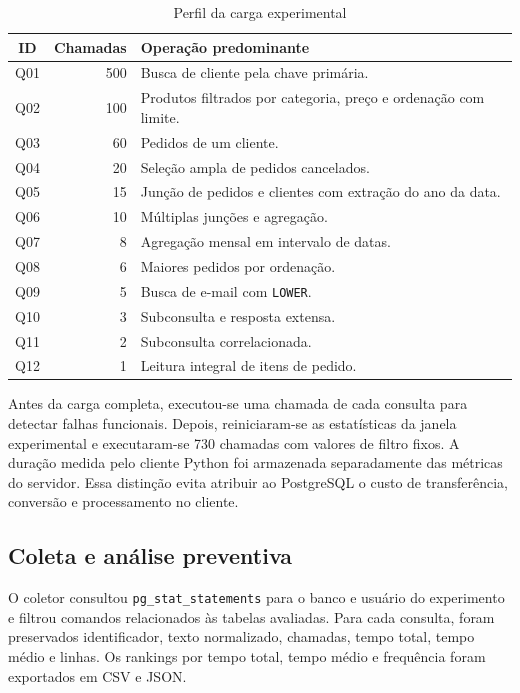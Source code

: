 \documentclass{UNESC}
\newcommand{\codigo}[1]{\texttt{#1}}
\begin{document}
\begin{table}[H]
\centering
\caption{Perfil da carga experimental}
\label{tab:carga}
\small
\begin{tabularx}{\textwidth}{c r Y}
\toprule
\textbf{ID} & \textbf{Chamadas} & \textbf{Operação predominante}\\
\midrule
Q01 & 500 & Busca de cliente pela chave primária.\\
Q02 & 100 & Produtos filtrados por categoria, preço e ordenação com limite.\\
Q03 & 60 & Pedidos de um cliente.\\
Q04 & 20 & Seleção ampla de pedidos cancelados.\\
Q05 & 15 & Junção de pedidos e clientes com extração do ano da data.\\
Q06 & 10 & Múltiplas junções e agregação.\\
Q07 & 8 & Agregação mensal em intervalo de datas.\\
Q08 & 6 & Maiores pedidos por ordenação.\\
Q09 & 5 & Busca de e-mail com \codigo{LOWER}.\\
Q10 & 3 & Subconsulta e resposta extensa.\\
Q11 & 2 & Subconsulta correlacionada.\\
Q12 & 1 & Leitura integral de itens de pedido.\\
\bottomrule
\end{tabularx}
\end{table}

Antes da carga completa, executou-se uma chamada de cada consulta para detectar falhas funcionais. Depois, reiniciaram-se as estatísticas da janela experimental e executaram-se 730 chamadas com valores de filtro fixos. A duração medida pelo cliente Python foi armazenada separadamente das métricas do servidor. Essa distinção evita atribuir ao PostgreSQL o custo de transferência, conversão e processamento no cliente.

\subsection{Coleta e análise preventiva}

O coletor consultou \codigo{pg\_stat\_statements} para o banco e usuário do experimento e filtrou comandos relacionados às tabelas avaliadas. Para cada consulta, foram preservados identificador, texto normalizado, chamadas, tempo total, tempo médio e linhas. Os rankings por tempo total, tempo médio e frequência foram exportados em CSV e JSON.
\end{document}
